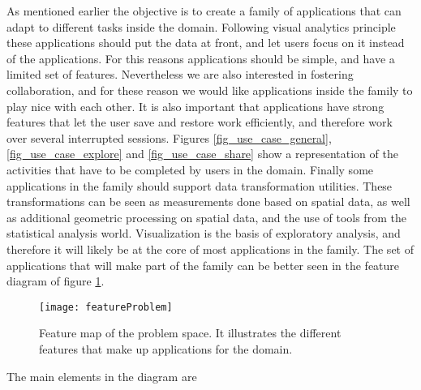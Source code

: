 As mentioned earlier the objective is to create a family of applications that can adapt to different tasks inside the domain. Following visual analytics principle these applications should put the data at front, and let users focus on it instead of the applications. For this reasons applications should be simple, and have a limited set of features. Nevertheless we are also interested in fostering collaboration, and for these reason we would like applications inside the family to play nice with each other. It is also important that applications have strong features that let the user save and restore work efficiently, and therefore work over several interrupted sessions. Figures \ref{fig_use_case_general}, \ref{fig_use_case_explore} and \ref{fig_use_case_share} show a representation of the activities that have to be completed by users in the domain.
Finally some applications in the family should support data transformation utilities. These transformations can be seen as measurements done based on spatial data, as well as additional geometric processing on spatial data, and the use of tools from the statistical analysis world. Visualization is the basis of exploratory analysis, and therefore it will likely be at the core of most applications in the family. The set of applications that will make part of the family can be better seen in the feature diagram of figure \ref{fig_feature_problem}.

\begin{figure}
\centering
\texttt{[image: featureProblem]}
\caption{\label{fig_feature_problem}Feature map of the problem space. It illustrates the different features that make up applications for the domain.}
\end{figure}

The main elements in the diagram are

